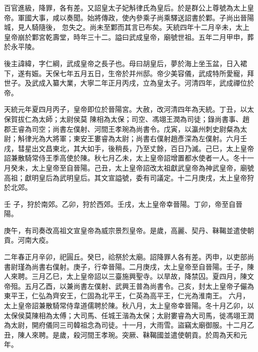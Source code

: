 \begin{pinyinscope}
 百官進級，降罪，各有差。又詔皇太子妃斛律氏為皇后。於是群公上尊號為太上皇帝。軍國大事，咸以奏聞。始將傳政，使內參乘子尚乘驛送詔書於鄴。子尚出晉陽城，見人騎隨後，
 忽失之。尚未至鄴而其言已布矣。天統四年十二月辛未，太上皇帝崩於鄴宮乾壽堂，時年三十二。謚曰武成皇帝，廟號世祖。五年二月甲申，葬於永平陵。



 後主諱緯，字仁綱，武成皇帝之長子也。母曰胡皇后，夢於海上坐玉盆，日入裙下，遂有娠。天保七年五月五日，生帝於并州邸。帝少美容儀，武成特所愛寵，拜世子。及武成入纂大業，大寧二年正月丙戌，立為皇太子。河清四年，武成禪位於帝。



 天統元年夏四月丙子，皇帝即位於晉陽宮。大赦，改河清四年為天統。丁丑，以太保賀拔仁為太師；太尉侯莫
 陳相為太保；司空、馮翊王潤為司徒；錄尚書事、趙郡王睿為司空；尚書左僕射、河間王孝琬為尚書令。戊寅，以瀛州刺史尉粲為太尉；斛律光為大將軍；東安王婁睿為太尉；尚書右僕射趙彥深為左僕射。六月壬戌，彗星出文昌東北，其大如手，後稍長，乃至丈餘，百日乃滅。己巳，太上皇帝詔兼散騎常侍王季高使於陳。秋七月乙未，太上皇帝詔增置都水使者一人。冬十一月癸未，太上皇帝至自晉陽。己丑，太上皇帝詔改太祖獻武皇帝為神武皇帝，廟號高祖；獻明皇后為武明皇后。其文宣謚號，委有司議定。十二月庚戌，太上皇帝狩於北郊。



 壬
 子，狩於南郊。乙卯，狩於西郊。壬戌，太上皇帝幸晉陽。丁卯，帝至自晉陽。



 庚午，有司奏改高祖文宣皇帝為威宗景烈皇帝。是歲，高麗、契丹、靺鞨並遣使朝貢。河南大疫。



 二年春正月辛卯，祀圓丘。癸巳，祫祭於太廟。詔降罪人各有差。丙申，以吏部尚書尉瑾為尚書右僕射。庚子，行幸晉陽。二月庚戌，太上皇帝至自晉陽。壬子，陳人來聘。三月乙巳，太上皇帝詔以三臺施興聖寺。以旱故，降禁囚。夏四月，陳文帝殂。五月乙酉，以兼尚書左僕射、武興王普為尚書令。己亥，封太上皇帝子儼為東平王，仁弘為齊安王，仁固為北平王，仁英為高平王，仁光為淮南王。
 六月，太上皇帝詔兼散騎常侍韋道儒聘於陳。秋八月，太上皇帝幸晉陽。冬十月乙卯，以太保侯莫陳相為太傅；大司馬、任城王湝為太保；太尉婁睿為大司馬，徙馮翊王潤為太尉，開府儀同三司韓祖念為司徒。十一月，大雨雪。盜竊太廟御服。十二月乙丑，陳人來聘。是歲，殺河間王孝琬。突厥、靺鞨國並遣使朝貢。於周為天和元年。




\end{pinyinscope}

